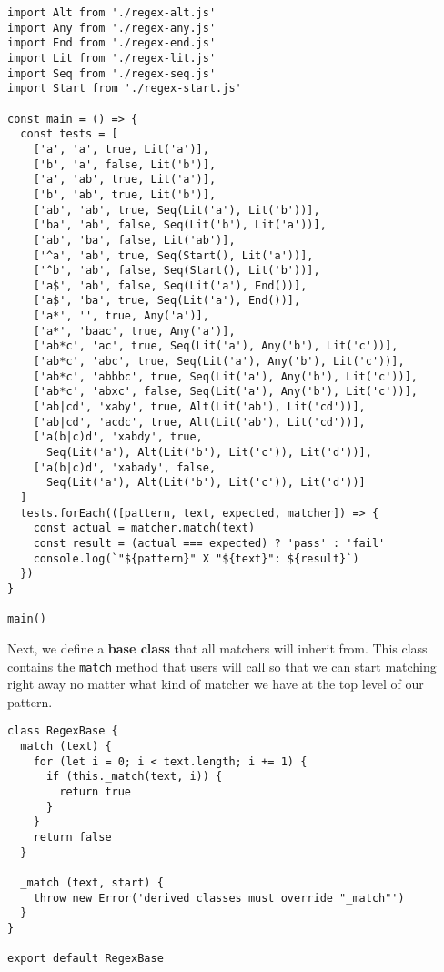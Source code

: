 \documentclass[krantzl]{krantz}
\newcommand{\glossref}[1]{\textbf{#1}}
\begin{document}
\begin{lstlisting}[frame=tblr]
import Alt from './regex-alt.js'
import Any from './regex-any.js'
import End from './regex-end.js'
import Lit from './regex-lit.js'
import Seq from './regex-seq.js'
import Start from './regex-start.js'

const main = () => {
  const tests = [
    ['a', 'a', true, Lit('a')],
    ['b', 'a', false, Lit('b')],
    ['a', 'ab', true, Lit('a')],
    ['b', 'ab', true, Lit('b')],
    ['ab', 'ab', true, Seq(Lit('a'), Lit('b'))],
    ['ba', 'ab', false, Seq(Lit('b'), Lit('a'))],
    ['ab', 'ba', false, Lit('ab')],
    ['^a', 'ab', true, Seq(Start(), Lit('a'))],
    ['^b', 'ab', false, Seq(Start(), Lit('b'))],
    ['a$', 'ab', false, Seq(Lit('a'), End())],
    ['a$', 'ba', true, Seq(Lit('a'), End())],
    ['a*', '', true, Any('a')],
    ['a*', 'baac', true, Any('a')],
    ['ab*c', 'ac', true, Seq(Lit('a'), Any('b'), Lit('c'))],
    ['ab*c', 'abc', true, Seq(Lit('a'), Any('b'), Lit('c'))],
    ['ab*c', 'abbbc', true, Seq(Lit('a'), Any('b'), Lit('c'))],
    ['ab*c', 'abxc', false, Seq(Lit('a'), Any('b'), Lit('c'))],
    ['ab|cd', 'xaby', true, Alt(Lit('ab'), Lit('cd'))],
    ['ab|cd', 'acdc', true, Alt(Lit('ab'), Lit('cd'))],
    ['a(b|c)d', 'xabdy', true,
      Seq(Lit('a'), Alt(Lit('b'), Lit('c')), Lit('d'))],
    ['a(b|c)d', 'xabady', false,
      Seq(Lit('a'), Alt(Lit('b'), Lit('c')), Lit('d'))]
  ]
  tests.forEach(([pattern, text, expected, matcher]) => {
    const actual = matcher.match(text)
    const result = (actual === expected) ? 'pass' : 'fail'
    console.log(`"${pattern}" X "${text}": ${result}`)
  })
}

main()
\end{lstlisting}



Next,
we define a \glossref{base class} that all matchers will inherit from.
This class contains the \texttt{match} method that users will call
so that we can start matching right away
no matter what kind of matcher we have at the top level of our pattern.


\begin{lstlisting}[frame=tblr]
class RegexBase {
  match (text) {
    for (let i = 0; i < text.length; i += 1) {
      if (this._match(text, i)) {
        return true
      }
    }
    return false
  }

  _match (text, start) {
    throw new Error('derived classes must override "_match"')
  }
}

export default RegexBase
\end{lstlisting}
\end{document}
